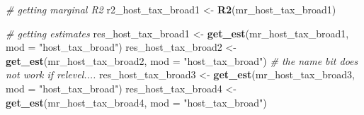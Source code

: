 \documentclass[
]{article}
\newenvironment{Shaded}{\begin{snugshade}}{\end{snugshade}}
\newcommand{\CommentTok}[1]{\textcolor[rgb]{0.56,0.35,0.01}{\textit{#1}}}
\newcommand{\DataTypeTok}[1]{\textcolor[rgb]{0.13,0.29,0.53}{#1}}
\newcommand{\KeywordTok}[1]{\textcolor[rgb]{0.13,0.29,0.53}{\textbf{#1}}}
\newcommand{\NormalTok}[1]{#1}
\newcommand{\StringTok}[1]{\textcolor[rgb]{0.31,0.60,0.02}{#1}}
\begin{document}
\begin{Shaded}
\begin{Highlighting}[]
\CommentTok{# getting marginal R2}
\NormalTok{r2_host_tax_broad1 <-}\StringTok{ }\KeywordTok{R2}\NormalTok{(mr_host_tax_broad1)}

\CommentTok{# getting estimates}
\NormalTok{res_host_tax_broad1 <-}\StringTok{ }\KeywordTok{get_est}\NormalTok{(mr_host_tax_broad1, }\DataTypeTok{mod =} \StringTok{"host_tax_broad"}\NormalTok{)}
\NormalTok{res_host_tax_broad2 <-}\StringTok{ }\KeywordTok{get_est}\NormalTok{(mr_host_tax_broad2, }\DataTypeTok{mod =} \StringTok{"host_tax_broad"}\NormalTok{)}
\CommentTok{# the name bit does not work if relevel....}
\NormalTok{res_host_tax_broad3 <-}\StringTok{ }\KeywordTok{get_est}\NormalTok{(mr_host_tax_broad3, }\DataTypeTok{mod =} \StringTok{"host_tax_broad"}\NormalTok{)}
\NormalTok{res_host_tax_broad4 <-}\StringTok{ }\KeywordTok{get_est}\NormalTok{(mr_host_tax_broad4, }\DataTypeTok{mod =} \StringTok{"host_tax_broad"}\NormalTok{)}


\end{Highlighting}
\end{Shaded}
\end{document}
